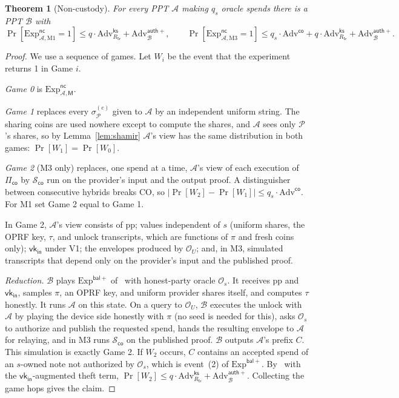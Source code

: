 \documentclass[11pt]{article}
\newtheorem{theorem}{Theorem}
\theoremstyle{remark}
\newcommand{\vk}{\mathsf{vk}}
\begin{document}
\begin{theorem}[Non-custody]
\label{prop:custody}
For every PPT $\mathcal{A}$ making $q_s$ oracle spends there is a PPT $\mathcal{B}$ with
\[
\Pr[\mathrm{Exp}^{\mathsf{nc}}_{\mathcal{A},\mathrm{M1}} = 1] \le q\cdot\mathrm{Adv}^{\mathsf{ks}}_{R_{\mathsf{tr}}} + \mathrm{Adv}^{\mathsf{auth}+}_{\mathcal{B}},\qquad
\Pr[\mathrm{Exp}^{\mathsf{nc}}_{\mathcal{A},\mathrm{M3}} = 1] \le q_s\cdot\mathrm{Adv}^{\mathsf{co}} + q\cdot\mathrm{Adv}^{\mathsf{ks}}_{R_{\mathsf{tr}}} + \mathrm{Adv}^{\mathsf{auth}+}_{\mathcal{B}}.
\]
\end{theorem}
\begin{proof}
We use a sequence of games. Let $W_i$ be the event that the experiment returns 1 in Game $i$.

\emph{Game 0} is $\mathrm{Exp}^{\mathsf{nc}}_{\mathcal{A},\mathsf{M}}$.

\emph{Game 1} replaces every $\sigma^{(e)}_{\mathcal{P}}$ given to $\mathcal{A}$ by an independent uniform string. The sharing coins are used nowhere except to compute the shares, and $\mathcal{A}$ sees only $\mathcal{P}$'s shares, so by Lemma~\ref{lem:shamir} $\mathcal{A}$'s view has the same distribution in both games: $\Pr[W_1] = \Pr[W_0]$.

\emph{Game 2} (M3 only) replaces, one spend at a time, $\mathcal{A}$'s view of each execution of $\Pi_{\mathsf{co}}$ by $\mathcal{S}_{\mathsf{co}}$ run on the provider's input and the output proof. A distinguisher between consecutive hybrids breaks CO, so $|\Pr[W_2] - \Pr[W_1]| \le q_s \cdot \mathrm{Adv}^{\mathsf{co}}$. For M1 set Game 2 equal to Game 1.

In Game 2, $\mathcal{A}$'s view consists of $\mathrm{pp}$; values independent of $s$ (uniform shares, the OPRF key, $\tau$, and unlock transcripts, which are functions of $\pi$ and fresh coins only); $\vk_{\mathsf{in}}$ under V1; the envelopes produced by $\mathcal{O}_U$; and, in M3, simulated transcripts that depend only on the provider's input and the published proof.

\emph{Reduction.} $\mathcal{B}$ plays $\mathrm{Exp}^{\mathsf{bal}+}$ of~\cite{sb26} with honest-party oracle $\mathcal{O}_s$. It receives $\mathrm{pp}$ and $\vk_{\mathsf{in}}$, samples $\pi$, an OPRF key, and uniform provider shares itself, and computes $\tau$ honestly. It runs $\mathcal{A}$ on this state. On a query to $\mathcal{O}_U$, $\mathcal{B}$ executes the unlock with $\mathcal{A}$ by playing the device side honestly with $\pi$ (no seed is needed for this), asks $\mathcal{O}_s$ to authorize and publish the requested spend, hands the resulting envelope to $\mathcal{A}$ for relaying, and in M3 runs $\mathcal{S}_{\mathsf{co}}$ on the published proof. $\mathcal{B}$ outputs $\mathcal{A}$'s prefix $C$. This simulation is exactly Game 2. If $W_2$ occurs, $C$ contains an accepted spend of an $s$-owned note not authorized by $\mathcal{O}_s$, which is event~(2) of $\mathrm{Exp}^{\mathsf{bal}+}$. By~\cite[Cor.~2]{sb26} with the $\vk_{\mathsf{in}}$-augmented theft term, $\Pr[W_2] \le q\cdot\mathrm{Adv}^{\mathsf{ks}}_{R_{\mathsf{tr}}} + \mathrm{Adv}^{\mathsf{auth}+}_{\mathcal{B}}$. Collecting the game hops gives the claim.
\end{proof}
\end{document}
